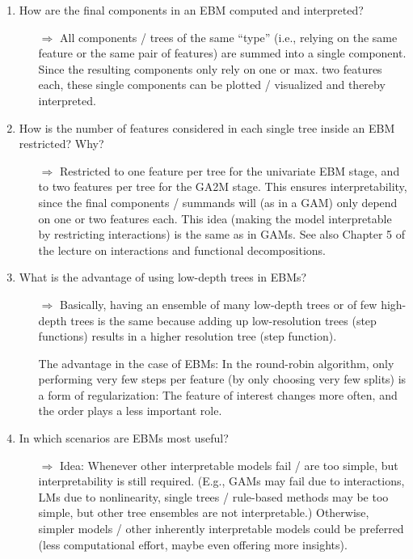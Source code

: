 \begin{enumerate}
    \item How are the final components in an EBM computed and interpreted?
    \begin{itemize}
        \item[$\Rightarrow$]
        All components / trees of the same ``type'' (i.e., relying on the same feature or the same pair of features) are summed into a single component.
        Since the resulting components only rely on one or max. two features each, these single components can be plotted / visualized and thereby interpreted.
    \end{itemize}

    \item How is the number of features considered in each single tree inside an EBM restricted? Why?
    \begin{itemize}
        \item[$\Rightarrow$]
        Restricted to one feature per tree for the univariate EBM stage, and to two features per tree for the GA2M stage.
        This ensures interpretability, since the final components / summands will (as in a GAM) only depend on one or two features each.
        This idea (making the model interpretable by restricting interactions) is the same as in GAMs. %
        See also Chapter 5 of the lecture on interactions and functional decompositions.
    \end{itemize}

    \item What is the advantage of using low-depth trees in EBMs?
    \begin{itemize}
        \item[$\Rightarrow$]
        Basically, having an ensemble of many low-depth trees or of few high-depth trees is the same because adding up low-resolution trees (step functions) results in a higher resolution tree (step function).
        
        The advantage in the case of EBMs: In the round-robin algorithm, only performing very few steps per feature (by only choosing very few splits) is a form of regularization: The feature of interest changes more often, and the order plays a less important role.
    \end{itemize}

    \item In which scenarios are EBMs most useful?
    \begin{itemize}
        \item[$\Rightarrow$]
        Idea: Whenever other interpretable models fail / are too simple, but interpretability is still required.
        (E.g., GAMs may fail due to interactions, LMs due to nonlinearity, single trees / rule-based methods may be too simple, but other tree ensembles are not interpretable.)
        Otherwise, simpler models / other inherently interpretable models could be preferred (less computational effort, maybe even offering more insights).


\end{itemize}
\end{enumerate}
